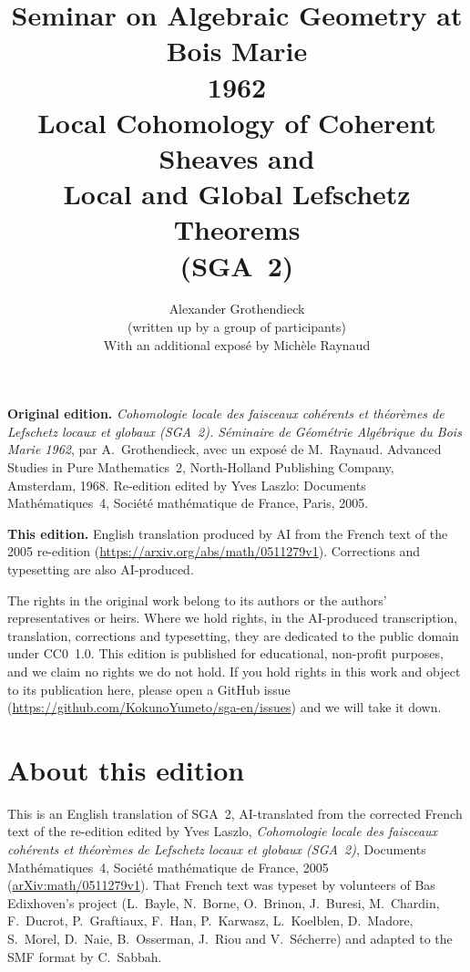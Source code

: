 \documentclass[11pt,a4paper,oneside]{book}
\begin{document}
\frontmatter

\title{Seminar on Algebraic Geometry at Bois Marie\\
   1962\\[0.4em]
   Local Cohomology of Coherent Sheaves and\\
   Local and Global Lefschetz Theorems\\
   (SGA~2)}

\author{Alexander Grothendieck\\
  {\small (written up by a group of participants)}\\[0.5em]
  With an additional expos\'e by Mich\`ele Raynaud}

\maketitle
\clearpage
\thispagestyle{empty}
\null\vfill
\begingroup\small
\noindent\textbf{Original edition.} \textit{Cohomologie locale des faisceaux coh\'erents et th\'eor\`emes de Lefschetz locaux et globaux (SGA~2). S\'eminaire de G\'eom\'etrie Alg\'ebrique du Bois Marie 1962}, par A.~Grothendieck, avec un expos\'e de M.~Raynaud. Advanced Studies in Pure Mathematics~2, North-Holland Publishing Company, Amsterdam, 1968. Re-edition edited by Yves Laszlo: Documents Math\'ematiques~4, Soci\'et\'e math\'ematique de France, Paris, 2005.\par
\medskip
\noindent\textbf{This edition.} English translation produced by AI from the French text of the 2005 re-edition (\url{https://arxiv.org/abs/math/0511279v1}). Corrections and typesetting are also AI-produced.\par
\medskip
\noindent The rights in the original work belong to its authors or the authors' representatives or heirs. Where we hold rights, in the AI-produced transcription, translation, corrections and typesetting, they are dedicated to the public domain under CC0~1.0. This edition is published for educational, non-profit purposes, and we claim no rights we do not hold. If you hold rights in this work and object to its publication here, please open a GitHub issue (\url{https://github.com/KokunoYumeto/sga-en/issues}) and we will take it down.\par
\endgroup
\clearpage

\chapter*{About this edition}
This is an English translation of SGA~2, AI-translated from the corrected
French text of the re-edition edited by Yves Laszlo, \emph{Cohomologie locale
des faisceaux coh\'erents et th\'eor\`emes de Lefschetz locaux et globaux
(SGA~2)}, Documents Math\'ematiques~4, Soci\'et\'e math\'ematique de France,
2005 (\href{https://arxiv.org/abs/math/0511279v1}{arXiv:math/0511279v1}).
That French text was typeset by volunteers of Bas Edixhoven's project
(L.~Bayle, N.~Borne, O.~Brinon, J.~Buresi, M.~Chardin, F.~Ducrot,
P.~Graftiaux, F.~Han, P.~Karwasz, L.~Koelblen, D.~Madore, S.~Morel, D.~Naie,
B.~Osserman, J.~Riou and V.~S\'echerre) and adapted to the SMF format by
C.~Sabbah.
\end{document}
